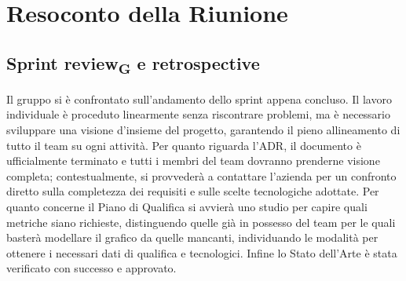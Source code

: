 \section{Resoconto della Riunione}

\subsection{Sprint review\textsubscript{G} e retrospective}
Il gruppo si è confrontato sull’andamento dello
sprint appena concluso. Il lavoro individuale è proceduto linearmente senza riscontrare problemi, 
ma è necessario sviluppare una visione d'insieme del progetto, 
garantendo il pieno allineamento di tutto il team su ogni attività. 
Per quanto riguarda l'ADR, il documento è ufficialmente terminato 
e tutti i membri del team dovranno prenderne visione completa; contestualmente, 
si provvederà a contattare l’azienda per un confronto diretto sulla completezza dei requisiti 
e sulle scelte tecnologiche adottate. Per quanto concerne il Piano di Qualifica 
si avvierà uno studio per capire quali metriche siano richieste, 
distinguendo quelle già in possesso del team per le quali basterà modellare il grafico da quelle mancanti, 
individuando le modalità per ottenere i necessari dati di qualifica e tecnologici. 
Infine lo Stato dell'Arte è stata verificato con successo e approvato.

